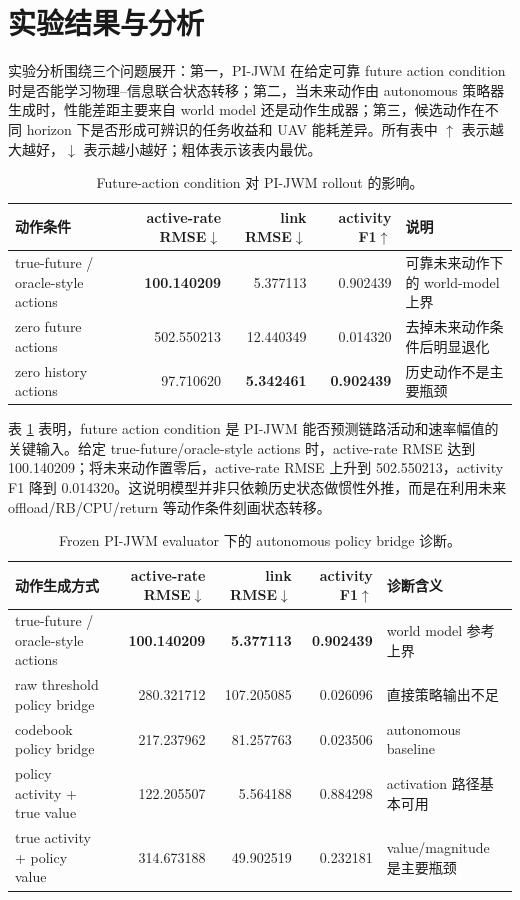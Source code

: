 \documentclass[letterpaper,journal]{IEEEtran}
\newcommand{\pjwm}{PI-JWM}
\newcommand{\tabfontsize}{\footnotesize}
\begin{document}
\section{实验结果与分析}

实验分析围绕三个问题展开：第一，\pjwm{} 在给定可靠 future action condition 时是否能学习物理--信息联合状态转移；第二，当未来动作由 autonomous 策略器生成时，性能差距主要来自 world model 还是动作生成器；第三，候选动作在不同 horizon 下是否形成可辨识的任务收益和 UAV 能耗差异。所有表中 $\uparrow$ 表示越大越好，$\downarrow$ 表示越小越好；粗体表示该表内最优。

\begin{table}[!t]
\centering
\tabfontsize
\begin{tabular}{lrrrl}
\toprule
动作条件 & active-rate RMSE$\downarrow$ & link RMSE$\downarrow$ & activity F1$\uparrow$ & 说明 \\
\midrule
true-future / oracle-style actions & \textbf{100.140209} & 5.377113 & 0.902439 & 可靠未来动作下的 world-model 上界 \\
zero future actions & 502.550213 & 12.440349 & 0.014320 & 去掉未来动作条件后明显退化 \\
zero history actions & 97.710620 & \textbf{5.342461} & \textbf{0.902439} & 历史动作不是主要瓶颈 \\
\bottomrule
\end{tabular}
\caption{Future-action condition 对 \pjwm{} rollout 的影响。}
\label{tab:future_action_condition}
\end{table}

表 \ref{tab:future_action_condition} 表明，future action condition 是 \pjwm{} 能否预测链路活动和速率幅值的关键输入。给定 true-future/oracle-style actions 时，active-rate RMSE 达到 100.140209；将未来动作置零后，active-rate RMSE 上升到 502.550213，activity F1 降到 0.014320。这说明模型并非只依赖历史状态做惯性外推，而是在利用未来 offload/RB/CPU/return 等动作条件刻画状态转移。

\begin{table}[!t]
\centering
\tabfontsize
\begin{tabular}{lrrrl}
\toprule
动作生成方式 & active-rate RMSE$\downarrow$ & link RMSE$\downarrow$ & activity F1$\uparrow$ & 诊断含义 \\
\midrule
true-future / oracle-style actions & \textbf{100.140209} & \textbf{5.377113} & \textbf{0.902439} & world model 参考上界 \\
raw threshold policy bridge & 280.321712 & 107.205085 & 0.026096 & 直接策略输出不足 \\
codebook policy bridge & 217.237962 & 81.257763 & 0.023506 & autonomous baseline \\
policy activity + true value & 122.205507 & 5.564188 & 0.884298 & activation 路径基本可用 \\
true activity + policy value & 314.673188 & 49.902519 & 0.232181 & value/magnitude 是主要瓶颈 \\
\bottomrule
\end{tabular}
\caption{Frozen \pjwm{} evaluator 下的 autonomous policy bridge 诊断。}
\label{tab:policy_bridge_diagnosis}
\end{table}
\end{document}
